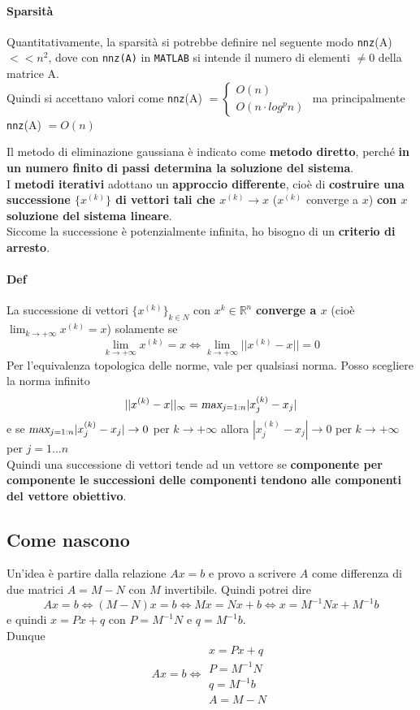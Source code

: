 \documentclass[10pt]{book}
\begin{document}
\paragraph{Sparsità} Quantitativamente, la sparsità si potrebbe definire nel seguente modo \texttt{nnz}(A) $<< n^2$, dove con \texttt{nnz(A)} in \texttt{MATLAB} si intende il numero di elementi $\neq 0$ della matrice A.\\
Quindi si accettano valori come \texttt{nnz}(A) $= \left\{ \begin{array}{l}O(n) \\ O(n\cdot log^p n) \end{array} \right. $ ma principalmente \texttt{nnz}(A) $= O(n)$
\pagebreak

Il metodo di eliminazione gaussiana è indicato come \textbf{metodo diretto}, perché \textbf{in un numero finito di passi determina la soluzione del sistema}.\\
I \textbf{metodi iterativi} adottano un \textbf{approccio differente}, cioè di \textbf{costruire una successione $\{x^{(k)}\}$ di vettori tali che $x^{(k)} \rightarrow x$} ($x^{(k)}$ converge a $x$) \textbf{con $x$ soluzione del sistema lineare}.\\
Siccome la successione è potenzialmente infinita, ho bisogno di un \textbf{criterio di arresto}.
\paragraph{Def} La successione di vettori $\{x^{(k)}\}_{k\in N}$ con $x^{k} \in \mathbb{R}^n$ \textbf{converge a $x$} (cioè $\lim_{k\to +\infty} x^{(k)} = x$) solamente se
$$\lim_{k\to +\infty} x^{(k)} = x \Leftrightarrow \lim_{k\to +\infty} ||x^{(k)} - x|| = 0$$
Per l'equivalenza topologica delle norme, vale per qualsiasi norma. Posso scegliere la norma infinito 
$$||x^{(k)} - x||_\infty = \textsl{max}_{j=1:n}|x_j^{(k)} - x_j|$$
e se $\textsl{max}_{j=1:n}|x_j^{(k)} - x_j| \rightarrow 0$ per $k \rightarrow +\infty$ allora $|x_j^{(k)} - x_j| \rightarrow 0$ per $k \rightarrow +\infty$ per $j = 1\ldots n$\\
Quindi una successione di vettori tende ad un vettore se \textbf{componente per componente le successioni delle componenti tendono alle componenti del vettore obiettivo}.
\subsection{Come nascono}
Un'idea è partire dalla relazione $Ax = b$ e provo a scrivere $A$ come differenza di due matrici $A = M - N$ con $M$ invertibile. Quindi potrei dire $$Ax = b \Leftrightarrow (M - N)x = b \Leftrightarrow Mx = Nx + b \Leftrightarrow x = M^{-1}Nx + M^{-1}b$$ e quindi $x = Px + q$ con $P = M^{-1}N$ e $q = M^{-1}b$.\\
Dunque $$Ax = b \Leftrightarrow \begin{array}{l}
x = Px + q \\
P = M^{-1}N\\q = M^{-1}b\\
A = M - N
\end{array}$$
\end{document}
